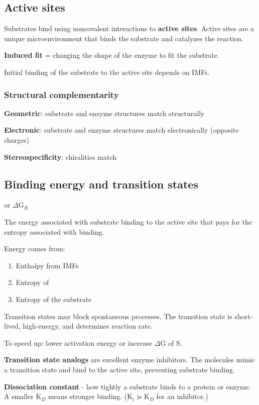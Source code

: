 \documentclass[letterpaper, 12pt]{article}
\begin{document}
\subsection*{Active sites}
Substrates bind using noncovalent interactions to \textbf{active sites}. Active sites are a unique microenvironment that binds the substrate and catalyzes the reaction.

\textbf{Induced fit} = changing the shape of the enzyme to fit the substrate.

Initial binding of the substrate to the active site depends on IMFs.

\subsubsection*{Structural complementarity}

\textbf{Geometric}: substrate and enzyme structures match structurally

\textbf{Electronic}: substrate and enzyme structures match electronically (opposite charges)

\textbf{Stereospecificity}: chiralities match

\subsection*{Binding energy and transition states}

or $\Delta$G$_B$

The energy associated with substrate binding to the active site that pays for the entropy associated with binding.

Energy comes from:

\begin{enumerate}
\item Enthalpy from IMFs
\item Entropy of 
\item Entropy of the substrate
\end{enumerate}

Transition states may block spontaneous processes. The transition state is short-lived, high-energy, and determines reaction rate.

To speed up: lower activation energy or increase $\Delta$G of S.

\textbf{Transition state analogs} are excellent enzyme inhibitors. The molecules mimic a transition state and bind to the active site, preventing substrate binding.

\textbf{Dissociation constant} - how tightly a substrate binds to a protein or enzyme. A smaller K$_D$ means stronger binding. (K$_i$ is K$_D$ for an inhibitor.)
\end{document}
